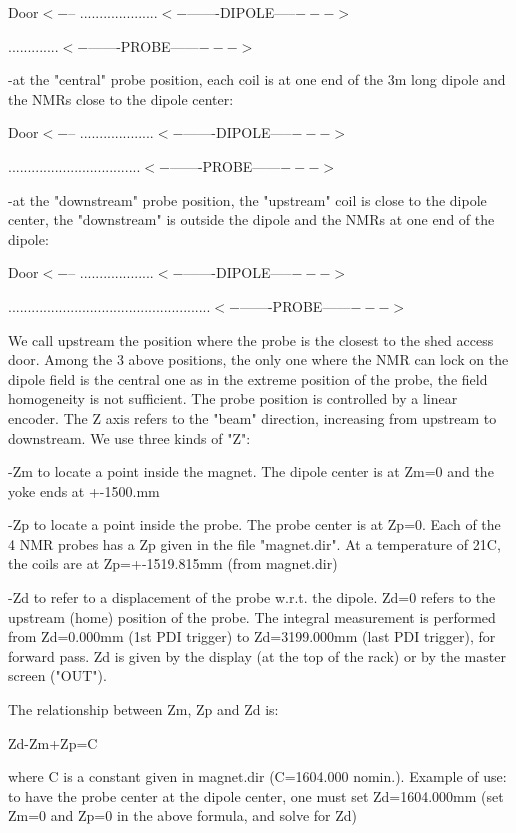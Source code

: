 {Door$<-$-- ....................$<-$-------DIPOLE-----$--->$ 

.............$<-$-------PROBE------$--->$ 

-at the "central" probe position, each coil is at one end
of the 3m long dipole and the NMRs close to the dipole center: 

Door$<-$-- ...................$<-$-------DIPOLE-----$--->$ 

..................................$<-$-------PROBE------$--->$ 

-at the "downstream" probe position, the 
"upstream"
coil is close to the dipole center, the "downstream" is outside
the dipole and the NMRs at one end of the dipole: 

Door$<-$-- ...................$<-$-------DIPOLE-----$--->$ 

....................................................$<-$-------PROBE------$--->$ 

We call upstream the position where the probe is the closest to the shed access
door. Among the 3 above positions, the only one where the NMR can lock on the 
dipole
field is the central one as in the extreme position of the probe, the field 
homogeneity
is not sufficient. The probe position is controlled by a linear encoder. The
Z axis refers to the "beam" direction, increasing from upstream
to downstream. We use three kinds of "Z": 

-Zm to locate a point inside the magnet. The dipole center is at Zm=0 and the
yoke ends at +-1500.mm 

-Zp to locate a point inside the probe. The probe center is at Zp=0. Each of
the 4 NMR probes has a Zp given in the file "magnet.dir".
At a temperature of 21C, the coils are at Zp=+-1519.815mm (from magnet.dir) 

-Zd to refer to a displacement of the probe w.r.t. the dipole. Zd=0 refers to
the upstream (home) position of the probe. The integral measurement is performed
from Zd=0.000mm (1st PDI trigger) to Zd=3199.000mm (last PDI trigger), for forward
pass. Zd is given by the display (at the top of the rack) or by the master screen
("OUT"). 

The relationship between Zm, Zp and Zd is: 

Zd-Zm+Zp=C 

where C is a constant given in magnet.dir (C=1604.000 nomin.). Example of use:
to have the probe center at the dipole center, one must set Zd=1604.000mm (set
Zm=0 and Zp=0 in the above formula, and solve for Zd) 

}
